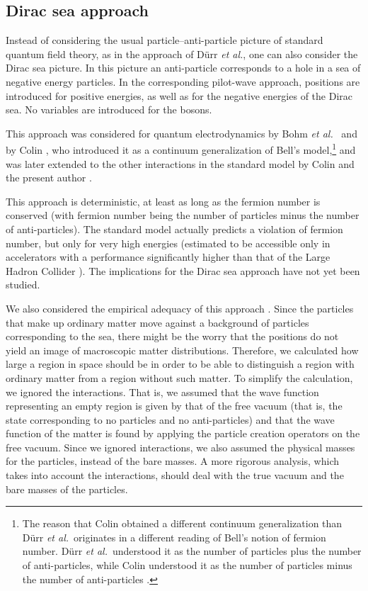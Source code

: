\documentclass[11pt]{article}
\begin{document}
\subsection{Dirac sea approach}
Instead of considering the usual particle--anti-particle picture of standard quantum field theory, as in the approach of D\"urr {\em et al.}, one can also consider the Dirac sea picture. In this picture an anti-particle corresponds to a hole in a sea of negative energy particles. In the corresponding pilot-wave approach, positions are introduced for positive energies, as well as for the negative energies of the Dirac sea. No variables are introduced for the bosons. 

This approach was considered for quantum electrodynamics by Bohm {\em et al.}\ \cite{bohm87b,bohm93} and by Colin \cite{colin03b,colin03c}, who introduced it as a continuum generalization of Bell's model,{\footnote{The reason that Colin obtained a different continuum generalization than D\"urr {\em et al.}\ originates in a different reading of Bell's notion of fermion number. D\"urr {\em et al.}\  understood it as the number of particles plus the number of anti-particles, while Colin understood it as the number of particles minus the number of anti-particles \cite{colin07}.}} and was later extended to the other interactions in the standard model by Colin and the present author \cite{colin07}. 

This approach is deterministic, at least as long as the fermion number is conserved (with fermion number being the number of particles minus the number of anti-particles). The standard model actually predicts a violation of fermion number, but only for very high energies (estimated to be accessible only in accelerators with a performance significantly higher than that of the  Large Hadron Collider \cite{colin07}). The implications for the Dirac sea approach have not yet been studied.

We also considered the empirical adequacy of this approach \cite{colin07}. Since the particles that make up ordinary matter move against a background of particles corresponding to the sea, there might be the worry that the positions do not yield an image of macroscopic matter distributions. Therefore, we calculated how large a region in space should be in order to be able to distinguish a region with ordinary matter from a region without such matter. To simplify the calculation, we ignored the interactions. That is, we assumed that the wave function representing an empty region is given by that of the free vacuum (that is, the state corresponding to no particles and no anti-particles) and that the wave function of the matter is found by applying the particle creation operators on the free vacuum. Since we ignored interactions, we also assumed the physical masses for the particles, instead of the bare masses. A more rigorous analysis, which takes into account the interactions, should deal with the true vacuum and the bare masses of the particles. 
\end{document}
